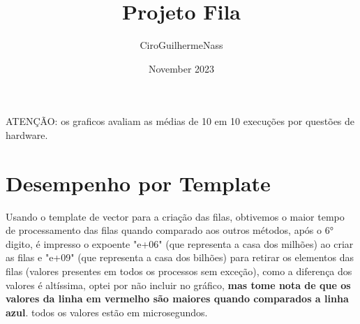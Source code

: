 \documentclass{article}
\title{Projeto Fila}
\author{CiroGuilhermeNass}
\date{November 2023}
\begin{document}
\maketitle
\begin{center}
ATENÇÃO: os graficos avaliam as médias de 10 em 10 execuções por questões de hardware.

\section{Desempenho por Template}
\end{center}
Usando o template de vector para a criação das filas, obtivemos o maior tempo de processamento das filas quando comparado aos outros métodos, após o 6° digito, é impresso o expoente "e+06" (que representa a casa dos milhões) ao criar as filas e "e+09" (que representa a casa dos bilhões) para retirar os elementos das filas (valores presentes em todos os processos sem exceção), como a diferença dos valores é altíssima, optei por não incluir no gráfico, \textbf{mas tome nota de que os valores da linha em vermelho são maiores quando comparados a linha azul}. todos os valores estão em microsegundos.
\begin{center}
\end{center}
\end{document}
